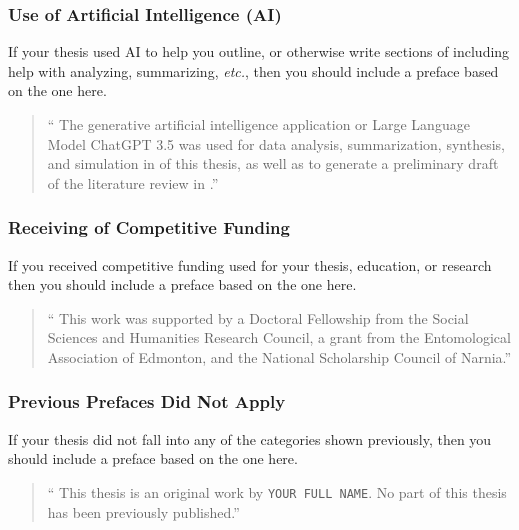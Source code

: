 			\subsubsection{Use of Artificial Intelligence (AI)}\label{preface:AI}
				If your thesis used AI to help you outline, or otherwise write sections of including help with analyzing, summarizing, \textit{etc.}, then you should include a preface based on the one here.

				\begin{quote}
					\enquote{%
						The generative artificial intelligence application or Large Language Model ChatGPT 3.5 was used for data analysis, summarization, synthesis, and simulation in  of this thesis, as well as to generate a preliminary draft of the literature review in .}
				\end{quote}
				
			\subsubsection{Receiving of Competitive Funding}\label{preface:CF}
				If you received competitive funding used for your thesis, education, or research then you should include a preface based on the one here.

				\begin{quote}
					\enquote{%
						This work was supported by a Doctoral Fellowship from the Social Sciences and Humanities Research Council, a grant from the Entomological Association of Edmonton, and the National Scholarship Council of Narnia.}
				\end{quote}
				
			\subsubsection{Previous Prefaces Did Not Apply}\label{preface:DNA}
				If your thesis did not fall into any of the categories shown previously, then you should include a preface based on the one here.
				

				\begin{quote}
					\enquote{%
						This thesis is an original work by \texttt{YOUR FULL NAME}. 
						No part of this thesis has been previously published.}
				\end{quote}

